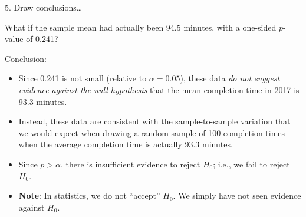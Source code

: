 \documentclass[
  ignorenonframetext,
  aspectratio=169]{beamer}
\begin{document}
\begin{frame}{5. Draw conclusions\ldots{}}
\protect\hypertarget{draw-conclusions-2}{}
\small

What if the sample mean had actually been 94.5 minutes, with a one-sided
\(p\)-value of 0.241?

Conclusion:

\begin{itemize}
\item
  Since 0.241 is not small (relative to \(\alpha = 0.05\)), these data
  \emph{do not suggest evidence against the null hypothesis} that the
  mean completion time in 2017 is 93.3 minutes.
\item
  Instead, these data are consistent with the sample-to-sample variation
  that we would expect when drawing a random sample of 100 completion
  times when the average completion time is actually 93.3 minutes.
\item
  Since \(p > \alpha\), there is insufficient evidence to reject
  \(H_0\); i.e., we fail to reject \(H_0\).
\item
  \textbf{Note}: In statistics, we do not ``accept'' \(H_0\). We simply
  have not seen evidence against \(H_0\).
\end{itemize}
\end{frame}
\end{document}
